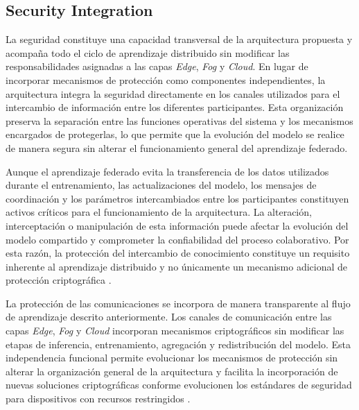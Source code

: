 \documentclass[journal,article,submit,moreauthors]{Definitions/mdpi}
\begin{document}
\subsection{Security Integration}
La seguridad constituye una capacidad transversal de la arquitectura propuesta y acompaña todo el ciclo de aprendizaje distribuido sin modificar las responsabilidades asignadas a las capas \textit{Edge}, \textit{Fog} y \textit{Cloud}. En lugar de incorporar mecanismos de protección como componentes independientes, la arquitectura integra la seguridad directamente en los canales utilizados para el intercambio de información entre los diferentes participantes. Esta organización preserva la separación entre las funciones operativas del sistema y los mecanismos encargados de protegerlas, lo que permite que la evolución del modelo se realice de manera segura sin alterar el funcionamiento general del aprendizaje federado.
%

Aunque el aprendizaje federado evita la transferencia de los datos utilizados durante el entrenamiento, las actualizaciones del modelo, los mensajes de coordinación y los parámetros intercambiados entre los participantes constituyen activos críticos para el funcionamiento de la arquitectura. La alteración, interceptación o manipulación de esta información puede afectar la evolución del modelo compartido y comprometer la confiabilidad del proceso colaborativo. Por esta razón, la protección del intercambio de conocimiento constituye un requisito inherente al aprendizaje distribuido y no únicamente un mecanismo adicional de protección criptográfica \cite{NIST800232,Kaur2025,Gusita2025}.

La protección de las comunicaciones se incorpora de manera transparente al flujo de aprendizaje descrito anteriormente. Los canales de comunicación entre las capas \textit{Edge}, \textit{Fog} y \textit{Cloud} incorporan mecanismos criptográficos sin modificar las etapas de inferencia, entrenamiento, agregación y redistribución del modelo. Esta independencia funcional permite evolucionar los mecanismos de protección sin alterar la organización general de la arquitectura y facilita la incorporación de nuevas soluciones criptográficas conforme evolucionen los estándares de seguridad para dispositivos con recursos restringidos \cite{NIST800232,Kaur2025}.
%
\end{document}
